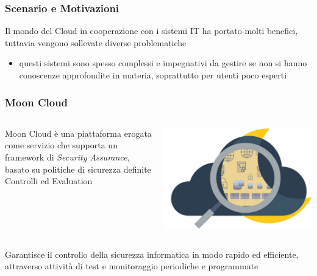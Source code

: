 \frame{\titlepage}

\begin{frame}
    \frametitle{Scenario e Motivazioni}
    Il mondo del Cloud in cooperazione con i sistemi IT ha portato molti benefici, tuttavia vengono sollevate diverse problematiche
    \begin{itemize}
        \item questi sistemi sono spesso \alert{complessi e impegnativi da gestire} se non si hanno conoscenze approfondite in materia, 
        soprattutto per utenti poco esperti
    \end{itemize}
\end{frame}

\begin{frame}
    \frametitle{Moon Cloud}
    \begin{columns}
        \begin{column}{0.55\textwidth}
            Moon Cloud è una piattaforma erogata come servizio che supporta un framework di \alert{\textit{Security Assurance}}, 
            basato su politiche di sicurezza definite Controlli ed Evaluation
        \end{column}
        \begin{column}{0.4\textwidth}
            \begin{center}
                \includegraphics[scale=0.12]{images/mc}
            \end{center}
        \end{column}
    \end{columns}
    Garantisce il controllo della sicurezza informatica in modo rapido ed efficiente, attraverso attività di test e monitoraggio 
    periodiche e programmate
\end{frame}

